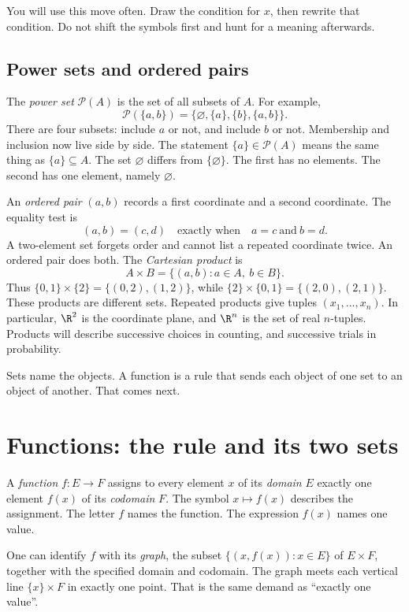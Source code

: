 You will use this move often. Draw the condition for $x$, then rewrite that condition. Do not shift the symbols first and hunt for a meaning afterwards.

\subsection*{Power sets and ordered pairs}

The \emph{power set} $\mathcal P(A)$ is the set of all subsets of $A$. For example,
\[
\mathcal P(\{a,b\})=\{\varnothing,\{a\},\{b\},\{a,b\}\}.
\]
There are four subsets: include $a$ or not, and include $b$ or not. Membership and inclusion now live side by side. The statement $\{a\}\in\mathcal P(A)$ means the same thing as $\{a\}\subseteq A$. The set $\varnothing$ differs from $\{\varnothing\}$. The first has no elements. The second has one element, namely $\varnothing$.

An \emph{ordered pair} $(a,b)$ records a first coordinate and a second coordinate. The equality test is
\[
(a,b)=(c,d)\quad\text{exactly when}\quad a=c\ \text{and}\ b=d.
\]
A two-element set forgets order and cannot list a repeated coordinate twice. An ordered pair does both. The \emph{Cartesian product} is
\[
A\times B=\{(a,b):a\in A,\ b\in B\}.
\]
Thus $\{0,1\}\times\{2\}=\{(0,2),(1,2)\}$, while $\{2\}\times\{0,1\}=\{(2,0),(2,1)\}$. These products are different sets. Repeated products give tuples $(x_1,\dots,x_n)$. In particular, $\R^2$ is the coordinate plane, and $\R^n$ is the set of real $n$-tuples. Products will describe successive choices in counting, and successive trials in probability.

Sets name the objects. A function is a rule that sends each object of one set to an object of another. That comes next.

\section{Functions: the rule and its two sets}

\begin{definitionx}[function]
A \emph{function} $f:E\to F$ assigns to every element $x$ of its \emph{domain} $E$ exactly one element $f(x)$ of its \emph{codomain} $F$. The symbol $x\mapsto f(x)$ describes the assignment. The letter $f$ names the function. The expression $f(x)$ names one value.
\end{definitionx}

One can identify $f$ with its \emph{graph}, the subset $\{(x,f(x)):x\in E\}$ of $E\times F$, together with the specified domain and codomain. The graph meets each vertical line $\{x\}\times F$ in exactly one point. That is the same demand as ``exactly one value''.


